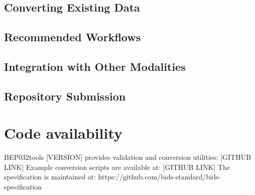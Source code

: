 \documentclass[fleqn,10pt]{wlscirep}
\begin{document}


\subsection*{Converting Existing Data}

\subsection*{Recommended Workflows}

\subsection*{Integration with Other Modalities}

\subsection*{Repository Submission}

\section*{Code availability}



BEP032tools [VERSION] provides validation and conversion utilities: [GITHUB LINK]
Example conversion scripts are available at: [GITHUB LINK]
The specification is maintained at: https://github.com/bids-standard/bids-specification


\end{document}
